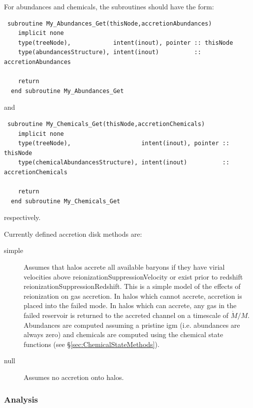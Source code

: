 For abundances and chemicals, the subroutines should have the form:
\begin{verbatim}
 subroutine My_Abundances_Get(thisNode,accretionAbundances)
    implicit none
    type(treeNode),            intent(inout), pointer :: thisNode
    type(abundancesStructure), intent(inout)          :: accretionAbundances

    return
  end subroutine My_Abundances_Get
\end{verbatim}
and
\begin{verbatim}
 subroutine My_Chemicals_Get(thisNode,accretionChemicals)
    implicit none
    type(treeNode),                    intent(inout), pointer :: thisNode
    type(chemicalAbundancesStructure), intent(inout)          :: accretionChemicals

    return
  end subroutine My_Chemicals_Get
\end{verbatim}
respectively.

Currently defined accretion disk methods are:
\begin{description}
 \item [{\normalfont \ttfamily simple}] Assumes that halos accrete all available baryons if they have virial velocities above {\normalfont \ttfamily reionizationSuppressionVelocity} or exist prior to redshift {\normalfont \ttfamily reionizationSuppressionRedshift}. This is a simple model of the effects of reionization on gas accretion. In halos which cannot accrete, accretion is placed into the failed mode. In halos which can accrete, any gas in the failed reservoir is returned to the accreted channel on a timescale of $\dot{M}/M$. Abundances are computed assuming a pristine \gls{igm} (i.e. abundances are always zero) and chemicals are computed using the chemical state functions (see \S\ref{sec:ChemicalStateMethods}).
 \item [{\normalfont \ttfamily null}] Assumes no accretion onto halos.
\end{description}

\subsubsection{Analysis}

